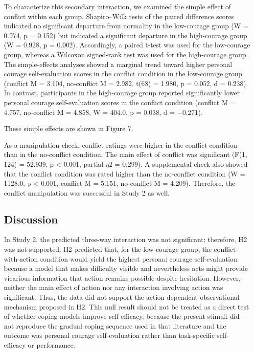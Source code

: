 \documentclass[utf8]{FrontiersinHarvard}
\begin{document}
To characterize this secondary interaction, we examined the simple effect of conflict within each group. Shapiro--Wilk tests of the paired difference scores indicated no significant departure from normality in the low-courage group (W = 0.974, p = 0.152) but indicated a significant departure in the high-courage group (W = 0.928, p = 0.002). Accordingly, a paired t-test was used for the low-courage group, whereas a Wilcoxon signed-rank test was used for the high-courage group. The simple-effects analyses showed a marginal trend toward higher personal courage self-evaluation scores in the conflict condition in the low-courage group (conflict M = 3.104, no-conflict M = 2.982, t(68) = 1.980, p = 0.052, d = 0.238). In contrast, participants in the high-courage group reported significantly lower personal courage self-evaluation scores in the conflict condition (conflict M = 4.757, no-conflict M = 4.858, W = 404.0, p = 0.038, d = $-$0.271).

These simple effects are shown in Figure 7.

As a manipulation check, conflict ratings were higher in the conflict condition than in the no-conflict condition. The main effect of conflict was significant (F(1, 124) = 52.939, p \textless{} 0.001, partial $\eta$2 = 0.299). A supplemental check also showed that the conflict condition was rated higher than the no-conflict condition (W = 1128.0, p \textless{} 0.001, conflict M = 5.151, no-conflict M = 4.209). Therefore, the conflict manipulation was successful in Study 2 as well.

\subsection{Discussion}\label{discussion-1}

In Study 2, the predicted three-way interaction was not significant; therefore, H2 was not supported. H2 predicted that, for the low-courage group, the conflict-with-action condition would yield the highest personal courage self-evaluation because a model that makes difficulty visible and nevertheless acts might provide vicarious information that action remains possible despite hesitation. However, neither the main effect of action nor any interaction involving action was significant. Thus, the data did not support the action-dependent observational mechanism proposed in H2. This null result should not be treated as a direct test of whether coping models improve self-efficacy, because the present stimuli did not reproduce the gradual coping sequence used in that literature and the outcome was personal courage self-evaluation rather than task-specific self-efficacy or performance.
\end{document}

